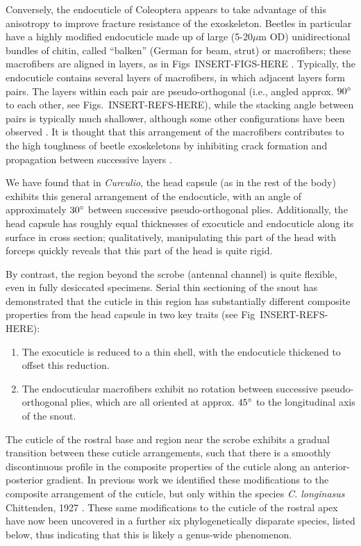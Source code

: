 \documentclass[twocolumn, linenumbers, superscriptaddress]{revtex4-1}
\begin{document}
		Conversely, the endocuticle of Coleoptera appears to take advantage of this anisotropy to improve fracture resistance of the exoskeleton.
		Beetles in particular have a highly modified endocuticle made up of large (5-20$\mu$m OD) unidirectional bundles of chitin, called ``balken'' (German for beam, strut) or macrofibers; these macrofibers are aligned in layers, as in Figs~INSERT-FIGS-HERE \cite{Kamp2010,Kamp2015}.
		Typically, the endocuticle contains several layers of macrofibers, in which adjacent layers form pairs. 
		The layers within each pair are pseudo-orthogonal (i.e., angled approx. $90\degree$ to each other, see Figs.~INSERT-REFS-HERE), while the stacking angle between pairs is typically much shallower, although some other configurations have been observed \cite{Hepburn1973,Kamp2010}.
		It is thought that this arrangement of the macrofibers contributes to the high toughness of beetle exoskeletons by inhibiting crack formation and propagation between successive layers \cite{Kamp2010,Kamp2015,Hepburn1973}.		
		
		We have found that in \textit{Curculio}, the head capsule (as in the rest of the body) exhibits this general arrangement of the endocuticle, with an angle of approximately $30\degree$ between successive pseudo-orthogonal plies.
		Additionally, the head capsule has roughly equal thicknesses of exocuticle and endocuticle along its surface in cross section; qualitatively, manipulating this part of the head with forceps quickly reveals that this part of the head is quite rigid.
		
		By contrast, the region beyond the scrobe (antennal channel) is quite flexible, even in fully desiccated specimens.
		Serial thin sectioning of the snout has demonstrated that the cuticle in this region has substantially different composite properties from the head capsule in two key traits (see Fig~INSERT-REFS-HERE):

		\begin{enumerate}
			\item The exocuticle is reduced to a thin shell, with the endocuticle thickened to offset this reduction.
			\item The endocuticular macrofibers exhibit no rotation between successive pseudo-orthogonal plies, which are all oriented at approx. $45\degree$ to the longitudinal axis of the snout.
		\end{enumerate}
		
		The cuticle of the rostral base and region near the scrobe exhibits a gradual transition between these cuticle arrangements, such that there is a smoothly discontinuous profile in the composite properties of the cuticle along an anterior-posterior gradient.		
		In previous work we identified these modifications to the composite arrangement of the cuticle, but only within the species \textit{C. longinasus} Chittenden, 1927 \cite{Jansen2016, Singh2016}.
		These same modifications to the cuticle of the rostral apex have now been uncovered in a further six phylogenetically disparate species, listed below, thus indicating that this is likely a genus-wide phenomenon.
		
\end{document}
